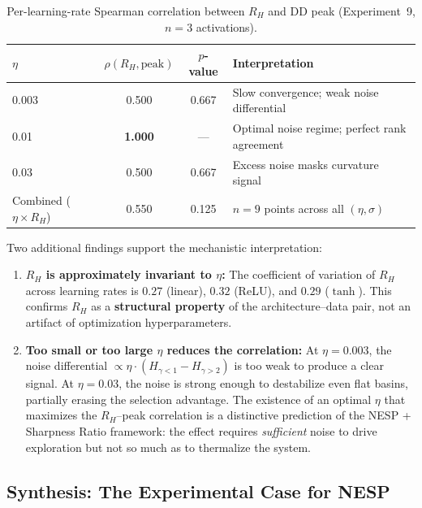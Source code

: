 \documentclass[
  journal=largetwo,
  simfonts=false,
  year=2025,
  volume=37,
]{cup-journal}
\begin{document}
\begin{table}[htb]
\centering
\footnotesize
\setlength{\tabcolsep}{3pt}
\caption{Per-learning-rate Spearman correlation between $R_H$ and DD peak (Experiment~9, $n=3$ activations).}
\label{tab:lr_modulation}
\begin{tabularx}{\textwidth}{lccX}
\toprule
$\eta$ & $\rho(R_H, \text{peak})$ & $p$-value & Interpretation \\
\midrule
0.003 & 0.500 & 0.667 & Slow convergence; weak noise differential \\
0.01  & \textbf{1.000} & ---  & Optimal noise regime; perfect rank agreement \\
0.03  & 0.500 & 0.667 & Excess noise masks curvature signal \\
\midrule
Combined ($\eta \times R_H$) & 0.550 & 0.125 & $n=9$ points across all $(\eta, \sigma)$ \\
\bottomrule
\end{tabularx}
\end{table}

Two additional findings support the mechanistic interpretation:

\begin{enumerate}
    \item \textbf{$R_H$ is approximately invariant to $\eta$:} The coefficient of variation of $R_H$ across learning rates is $0.27$ (linear), $0.32$ (ReLU), and $0.29$ ($\tanh$). This confirms $R_H$ as a \textbf{structural property} of the architecture--data pair, not an artifact of optimization hyperparameters.

    \item \textbf{Too small or too large $\eta$ reduces the correlation:} At $\eta = 0.003$, the noise differential $\propto \eta \cdot (H_{\gamma<1} - H_{\gamma>2})$ is too weak to produce a clear signal. At $\eta = 0.03$, the noise is strong enough to destabilize even flat basins, partially erasing the selection advantage. The existence of an optimal $\eta$ that maximizes the $R_H$--peak correlation is a distinctive prediction of the NESP + Sharpness Ratio framework: the effect requires \textit{sufficient} noise to drive exploration but not so much as to thermalize the system.
\end{enumerate}

\subsection{Synthesis: The Experimental Case for NESP}
\end{document}
